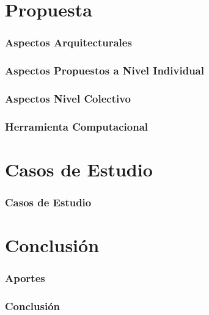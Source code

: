 \documentclass{beamer}
\begin{document}
\section{Propuesta}

\begin{frame}
\frametitle{Aspectos Arquitecturales}

\end{frame}

\begin{frame}
\frametitle{Aspectos Propuestos a Nivel Individual}

\end{frame}

\begin{frame}
\frametitle{Aspectos Nivel Colectivo}

\end{frame}

\begin{frame}
\frametitle{Herramienta Computacional}

\end{frame}

\section{Casos de Estudio}
\begin{frame}
\frametitle{Casos de Estudio}

\end{frame}


\section{Conclusión}
\begin{frame}
\frametitle{Aportes}

\end{frame}

\begin{frame}
\frametitle{Conclusión}

\end{frame}

\ThankYouFrame

\end{document}
